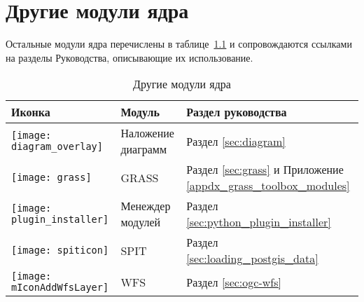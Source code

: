 
\chapter{Другие модули ядра}


Остальные модули ядра перечислены в таблице~\ref{tab:other_core} и
сопровождаются ссылками на разделы Руководства, описывающие их использование.

\begin{table}[H]
\centering
 \begin{tabular}{|l|l|p{8cm}|}
\hline \textbf{Иконка} & \textbf{Модуль} & \textbf{Раздел руководства}\\
\hline
\texttt{[image: diagram\_overlay]}
 & Наложение диаграмм \index{модули!диаграмма}& Раздел \ref{sec:diagram}\\
\hline
\texttt{[image: grass]}
 & GRASS \index{модули!инструменты GRASS} & Раздел \ref{sec:grass} и Приложение \ref{appdx_grass_toolbox_modules}\\
 \hline
\texttt{[image: plugin\_installer]}
 & Менеждер модулей \index{модули!Plugin Installer} & Раздел \ref{sec:python_plugin_installer}\\
\hline
\texttt{[image: spiticon]}
 & SPIT \index{модули!SPIT}& Раздел \ref{sec:loading_postgis_data} \\
 \hline
\texttt{[image: mIconAddWfsLayer]}
 & WFS & Раздел \ref{sec:ogc-wfs} \\
\hline
\end{tabular}
\caption{Другие модули ядра}\label{tab:other_core}
\end{table}
